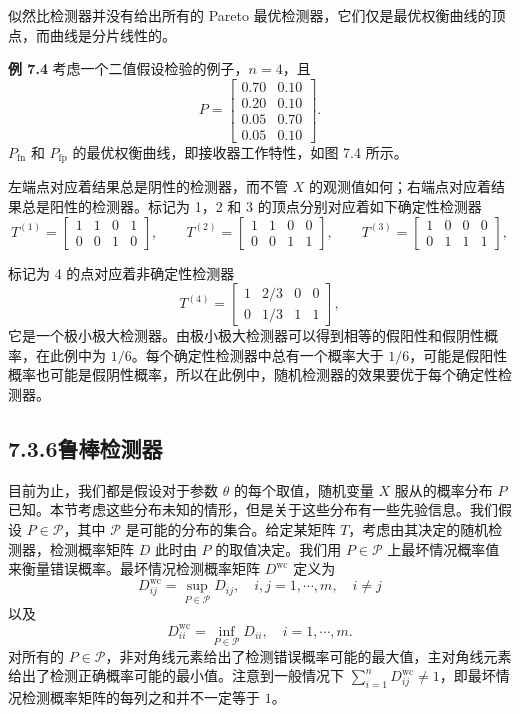 \documentclass[UTF8, 12pt, fontset=fandol, oneside]{ctexart}
\begin{document}
似然比检测器并没有给出所有的 Pareto 最优检测器，它们仅是最优权衡曲线的顶点，而曲线是分片线性的。

\noindent\textbf{例 7.4}\quad
考虑一个二值假设检验的例子，$n=4$，且
\begin{equation}
P=
\begin{bmatrix}
0.70 & 0.10\\
0.20 & 0.10\\
0.05 & 0.70\\
0.05 & 0.10
\end{bmatrix}.
\tag{7.15}
\end{equation}
$P_{\mathrm{fn}}$ 和 $P_{\mathrm{fp}}$ 的最优权衡曲线，即接收器工作特性，如图 7.4 所示。

左端点对应着结果总是阴性的检测器，而不管 $X$ 的观测值如何；右端点对应着结果总是阳性的检测器。标记为 1，2 和 3 的顶点分别对应着如下确定性检测器
\[
T^{(1)}=
\begin{bmatrix}
1 & 1 & 0 & 1\\
0 & 0 & 1 & 0
\end{bmatrix},
\qquad
T^{(2)}=
\begin{bmatrix}
1 & 1 & 0 & 0\\
0 & 0 & 1 & 1
\end{bmatrix},
\qquad
T^{(3)}=
\begin{bmatrix}
1 & 0 & 0 & 0\\
0 & 1 & 1 & 1
\end{bmatrix},
\]

标记为 4 的点对应着非确定性检测器
\[
T^{(4)}=
\begin{bmatrix}
1 & 2/3 & 0 & 0\\
0 & 1/3 & 1 & 1
\end{bmatrix},
\]
它是一个极小极大检测器。由极小极大检测器可以得到相等的假阳性和假阴性概率，在此例中为 $1/6$。每个确定性检测器中总有一个概率大于 $1/6$，可能是假阳性概率也可能是假阴性概率，所以在此例中，随机检测器的效果要优于每个确定性检测器。

\subsection*{7.3.6\quad 鲁棒检测器}

目前为止，我们都是假设对于参数 $\theta$ 的每个取值，随机变量 $X$ 服从的概率分布 $P$ 已知。本节考虑这些分布未知的情形，但是关于这些分布有一些先验信息。我们假设 $P\in\mathcal{P}$，其中 $\mathcal{P}$ 是可能的分布的集合。给定某矩阵 $T$，考虑由其决定的随机检测器，检测概率矩阵 $D$ 此时由 $P$ 的取值决定。我们用 $P\in\mathcal{P}$ 上最坏情况概率值来衡量错误概率。最坏情况检测概率矩阵 $D^{\mathrm{wc}}$ 定义为
\[
D_{ij}^{\mathrm{wc}}=\sup_{P\in\mathcal{P}}D_{ij},\quad i,j=1,\cdots,m,\quad i\neq j
\]
以及
\[
D_{ii}^{\mathrm{wc}}=\inf_{P\in\mathcal{P}}D_{ii},\quad i=1,\cdots,m.
\]
对所有的 $P\in\mathcal{P}$，非对角线元素给出了检测错误概率可能的最大值，主对角线元素给出了检测正确概率可能的最小值。注意到一般情况下 $\sum_{i=1}^nD_{ij}^{\mathrm{wc}}\neq 1$，即最坏情况检测概率矩阵的每列之和并不一定等于 $1$。
\end{document}
